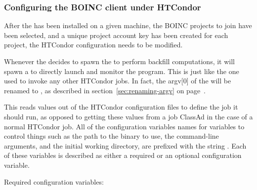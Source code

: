\subsubsection{\label{sec:Backfill-BOINC-HTCondor}Configuring the BOINC client
under HTCondor}


After the 
has been installed on a given machine, 
the BOINC projects to join have been selected, 
and a unique project account key has been created for each project,
the HTCondor configuration needs to be modified.

Whenever the  decides to spawn the 
to perform backfill computations,
it will spawn a  to directly launch and monitor the
 program.
This  is just like the one used to invoke any other HTCondor
jobs.
In fact, the argv[0] of the  will be renamed to
, as described in section~\ref{sec:renaming-argv} on 
page~\pageref{sec:renaming-argv}.

This  reads
values out of the HTCondor configuration files to define the job it
should run, as opposed to getting these values from a job ClassAd
in the case of a normal HTCondor job.
All of the configuration variables names for variables to control things 
such as the path to
the  binary to use, the command-line arguments,
and the initial working directory, are prefixed with the string
.
Each of these variables is described as either a required or an
optional configuration variable. 

Required configuration variables:

